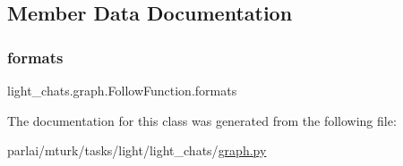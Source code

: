 \subsection{Member Data Documentation}
\mbox{\label{classlight__chats_1_1graph_1_1FollowFunction_a3d3473d546a129f03d497102b10ea2a9}} 
\subsubsection{\texorpdfstring{formats}{formats}}
{\footnotesize\ttfamily light\+\_\+chats.\+graph.\+Follow\+Function.\+formats}



The documentation for this class was generated from the following file\+:\begin{DoxyCompactItemize}
\item 
parlai/mturk/tasks/light/light\+\_\+chats/\hyperlink{parlai_2mturk_2tasks_2light_2light__chats_2graph_8py}{graph.\+py}\end{DoxyCompactItemize}
